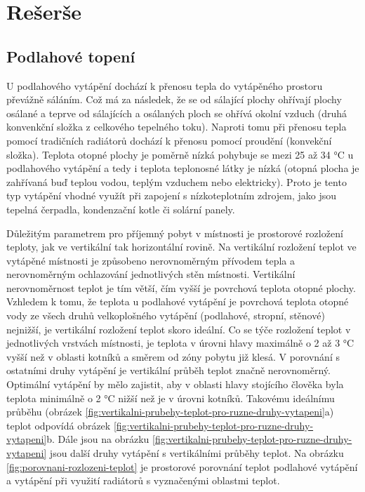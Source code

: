 

\chapter{Rešerše}


\section{Podlahové topení}

U podlahového vytápění dochází k přenosu tepla do vytápěného prostoru převážně sáláním. Což má za následek, že se od sálající plochy ohřívají plochy osálané a teprve od sálajících a osálaných ploch se ohřívá okolní vzduch (druhá konvenkční složka z celkového tepelného toku). Naproti tomu při přenosu tepla pomocí tradičních radiátorů dochází k přenosu pomocí proudění (konvekční složka). 
Teplota otopné plochy je poměrně nízká pohybuje se mezi 25 až 34 °C u podlahového vytápění a tedy i teplota teplonosné látky je nízká (otopná plocha je zahřívaná buď teplou vodou, teplým vzduchem nebo elektricky). Proto je tento typ vytápění vhodné využít při zapojení s nízkoteplotním zdrojem, jako jsou tepelná čerpadla, kondenzační kotle či solární panely.

Důležitým parametrem pro příjemný pobyt v místnosti je prostorové rozložení teploty, jak ve vertikální tak horizontální rovině. Na vertikální rozložení teplot ve vytápěné místnosti je způsobeno nerovnoměrným přívodem tepla a nerovnoměrným ochlazování jednotlivých stěn místnosti. Vertikální nerovnoměrnost teplot je tím větší, čím vyšší je povrchová teplota otopné plochy. Vzhledem k tomu, že teplota u podlahové vytápění je povrchová teplota otopné vody ze všech druhů velkoplošného vytápění (podlahové, stropní, stěnové) nejnižší, je vertikální rozložení teplot skoro ideální. Co se týče rozložení teplot v jednotlivých vrstvách místnosti, je teplota v úrovni hlavy maximálně o 2 až 3 °C vyšší než v oblasti kotníků a směrem od zóny pobytu již klesá. V porovnání s ostatními druhy vytápění je vertikální průběh teplot značně nerovnoměrný. Optimální vytápění by mělo zajistit, aby v oblasti hlavy stojícího člověka byla teplota minimálně o 2 °C nižší než je v úrovni kotníků. Takovému ideálnímu průběhu (obrázek  \ref{fig:vertikalni-prubehy-teplot-pro-ruzne-druhy-vytapeni}a) teplot odpovídá obrázek \ref{fig:vertikalni-prubehy-teplot-pro-ruzne-druhy-vytapeni}b. Dále jsou na obrázku  \ref{fig:vertikalni-prubehy-teplot-pro-ruzne-druhy-vytapeni} jsou další druhy vytápění s vertikálními průběhy teplot. Na obrázku \ref{fig:porovnani-rozlozeni-teplot} je prostorové porovnání teplot podlahové vytápění a vytápění při využití radiátorů s vyznačenými oblastmi teplot.


